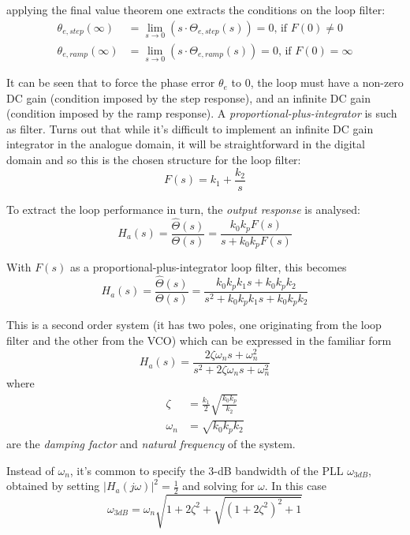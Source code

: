 applying the final value theorem one extracts the conditions on the loop filter:
\begin{align}
\theta_{e,step}(\infty) & =\lim_{s\to 0}\left(s\cdot\Theta_{e,step}(s)\right)=0\text{, if }F(0)\neq0\\
\theta_{e,ramp}(\infty) & =\lim_{s\to 0}\left(s\cdot\Theta_{e,ramp}(s)\right)=0\text{, if }F(0)=\infty
\end{align}

It can be seen that to force the phase error $\theta_e$ to 0, the loop must have a non-zero DC gain (condition imposed by the step response), and an infinite DC gain (condition imposed by the ramp response). A \emph{proportional-plus-integrator} is such as filter. Turns out that while it's difficult to implement an infinite DC gain integrator in the analogue domain, it will be straightforward in the digital domain and so this is the chosen structure for the loop filter:
\begin{equation}F(s)=k_1+\frac{k_2}{s}\end{equation}

To extract the loop performance in turn, the \emph{output response} is analysed:
\begin{equation}H_a(s)=\frac{\hat\Theta(s)}{\Theta(s)}=\frac{k_0 k_p F(s)}{s+k_0 k_p F(s)}\end{equation}

With $F(s)$ as a proportional-plus-integrator loop filter, this becomes
\begin{equation}H_a(s)=\frac{\hat\Theta(s)}{\Theta(s)}=\frac{k_0 k_p k_1 s + k_0 k_p k_2}{s^2+k_0 k_p k_1 s + k_0 k_p k_2}\end{equation}

This is a second order system (it has two poles, one originating from the loop filter and the other from the VCO) which can be expressed in the familiar form
\begin{equation} \label{eq:Ha_s}
  H_a(s)=\frac{2\zeta \omega_n s+\omega_n^2}{s^2+2\zeta \omega_n s+\omega_n^2}
\end{equation}
where
\begin{align}
\zeta & =\frac{k_1}{2}\sqrt{\frac{k_0 k_p}{k_2}}\\
\omega_n & = \sqrt{k_0 k_p k_2}
\end{align}
are the \emph{damping factor} and \emph{natural frequency} of the system.

Instead of $\omega_n$, it's common to specify the 3-dB bandwidth of the PLL $\omega_{3dB}$, obtained by setting $|H_a(j\omega)|^2=\frac{1}{2}$ and solving for $\omega$. In this case
\begin{equation}\omega_{3dB}=\omega_n \sqrt{1+2\zeta^2+\sqrt{(1+2\zeta^2)^2+1}}\end{equation}


